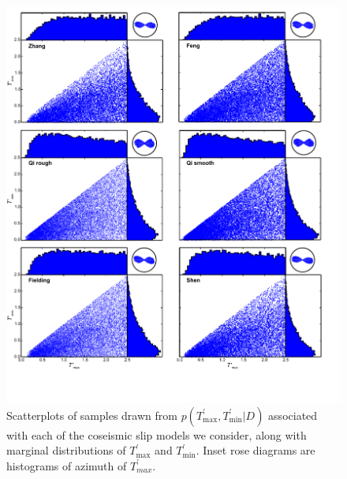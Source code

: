 \documentclass[draft,jgrga]{AGUTeX}
\begin{document}
\begin{figure}%
\centering
\includegraphics[width=40pc]{../figures/T_scatters.pdf}
\caption{Scatterplots of samples drawn from
$p(T^\prime_{\mathrm{max}},T^\prime_{\mathrm{min}} | D)$ associated with
each of the coseismic slip models we consider, along with marginal 
distributions of
$T^\prime_{\mathrm{max}}$ and $T^\prime_{\mathrm{min}}$. Inset rose
diagrams are histograms of azimuth of
$T^\prime_{max}$.}
\label{fig:T_scatters}
\end{figure}
\end{document}
